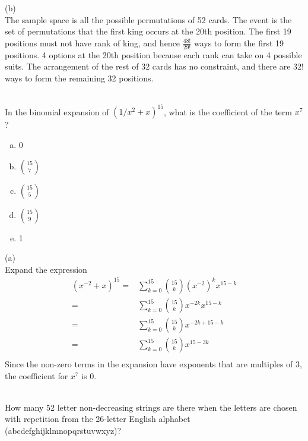 \begin{solution}

(b)\\
The sample space is all the possible permutations of 52 cards. The event is the set of permutations that the first king occurs at the 20th position. The first 19 positions must not have rank of king, and hence $\frac{48!}{29!}$ ways to form the first 19 positions. 4 options at the 20th position because each rank can take on 4 possible suits. The arrangement of the rest of 32 cards has no constraint, and there are 32! ways to form the remaining 32 positions.

\end{solution}
\\
In the binomial expansion of $(1/x^2 + x)^{15}$, what is the coefficient of the term $x^7$?
\begin{enumerate}[(a)]
	\item  0
    
	\item  $15 \choose 7$
    
	\item  $15 \choose 5$
    
	\item  $15 \choose 9$
    
	\item  1

\end{enumerate}
\begin{solution}

(a)\\
Expand the expression
\begin{align*}
(x^{-2} + x)^{15}  =& \sum_{k=0}^{15} {15\choose k}{(x^{-2})}^k {x}^{15-k} \\
=& \sum_{k=0}^{15} {15\choose k}x^{-2k} x^{15-k} \\
=& \sum_{k=0}^{15} {15\choose k}x^{-2k+15-k} \\
=& \sum_{k=0}^{15} {15\choose k}x^{15-3k}\\
\end{align*}
Since the non-zero terms in the expansion have exponents that are multiples of 3, the coefficient for $x^7$ is 0. 

\end{solution}
\\
How many 52 letter non-decreasing strings are there when the letters are chosen with repetition from the 26-letter English alphabet (abcdefghijklmnopqrstuvwxyz)?\\
